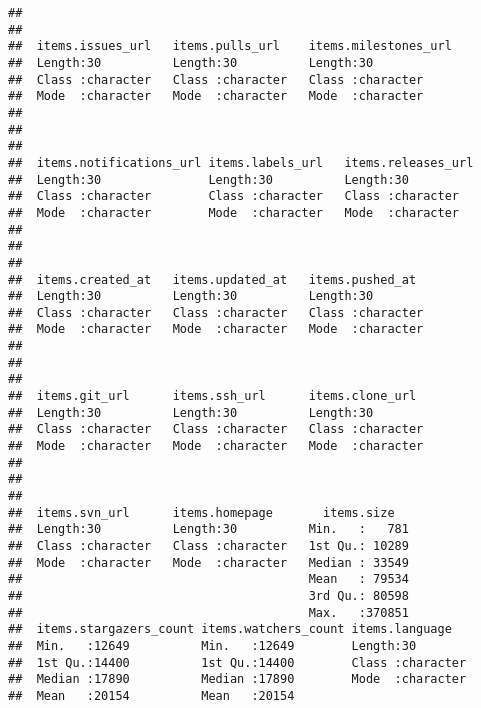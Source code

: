 \documentclass{article}\usepackage[]{graphicx}\usepackage[]{color}
\makeatletter
\newenvironment{kframe}{%
 \def\at@end@of@kframe{}%
 \ifinner\ifhmode%
  \def\at@end@of@kframe{\end{minipage}}%
  \begin{minipage}{\columnwidth}%
 \fi\fi%
 \def\FrameCommand##1{\hskip\@totalleftmargin \hskip-\fboxsep
 \colorbox{shadecolor}{##1}\hskip-\fboxsep
     \hskip-\linewidth \hskip-\@totalleftmargin \hskip\columnwidth}%
 \MakeFramed {\advance\hsize-\width
   \@totalleftmargin\z@ \linewidth\hsize
   \@setminipage}}%
 {\par\unskip\endMakeFramed%
 \at@end@of@kframe}
\newenvironment{knitrout}{}{} %
\makeatother
\begin{document}
\begin{knitrout}
\begin{kframe}
\begin{verbatim}
##                                                           
##                                                           
##  items.issues_url   items.pulls_url    items.milestones_url
##  Length:30          Length:30          Length:30           
##  Class :character   Class :character   Class :character    
##  Mode  :character   Mode  :character   Mode  :character    
##                                                            
##                                                            
##                                                            
##  items.notifications_url items.labels_url   items.releases_url
##  Length:30               Length:30          Length:30         
##  Class :character        Class :character   Class :character  
##  Mode  :character        Mode  :character   Mode  :character  
##                                                               
##                                                               
##                                                               
##  items.created_at   items.updated_at   items.pushed_at   
##  Length:30          Length:30          Length:30         
##  Class :character   Class :character   Class :character  
##  Mode  :character   Mode  :character   Mode  :character  
##                                                          
##                                                          
##                                                          
##  items.git_url      items.ssh_url      items.clone_url   
##  Length:30          Length:30          Length:30         
##  Class :character   Class :character   Class :character  
##  Mode  :character   Mode  :character   Mode  :character  
##                                                          
##                                                          
##                                                          
##  items.svn_url      items.homepage       items.size    
##  Length:30          Length:30          Min.   :   781  
##  Class :character   Class :character   1st Qu.: 10289  
##  Mode  :character   Mode  :character   Median : 33549  
##                                        Mean   : 79534  
##                                        3rd Qu.: 80598  
##                                        Max.   :370851  
##  items.stargazers_count items.watchers_count items.language    
##  Min.   :12649          Min.   :12649        Length:30         
##  1st Qu.:14400          1st Qu.:14400        Class :character  
##  Median :17890          Median :17890        Mode  :character  
##  Mean   :20154          Mean   :20154                          

\end{verbatim}
\end{kframe}
\end{knitrout}
\end{document}
